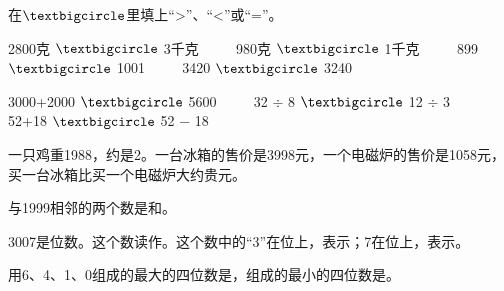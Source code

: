 \documentclass[12pt]{exam-zh}
\begin{document}
\begin{question}
在$\textbigcircle$里填上“>”、“<”或“=”。

2800克 $\textbigcircle$ 3千克 $\quad\quad$ 980克 $\textbigcircle$ 1千克 $\quad\quad$ 899 $\textbigcircle$ 1001 $\quad\quad$ 3420 $\textbigcircle$ 3240

3000+2000 $\textbigcircle$ 5600 $\quad\quad$ 32 $\div$ 8 $\textbigcircle$ 12 $\div$ 3 $\quad\quad$ 52+18 $\textbigcircle$ 52 $-$ 18
\end{question}

\begin{question}
一只鸡重1988\fillin[width=3em][]，约是2\fillin[width=3em][]。一台冰箱的售价是3998元，一个电磁炉的售价是1058元，买一台冰箱比买一个电磁炉大约贵\fillin[width=3em][]元。
\end{question}

\begin{question}
与1999相邻的两个数是\fillin[width=3em][]和\fillin[width=3em][]。
\end{question}

\begin{question}
3007是\fillin[width=3em][]位数。这个数读作\fillin[width=10em][]。这个数中的“3”在\fillin[width=3em][]位上，表示\fillin[width=10em][]；7在\fillin[width=3em][]位上，表示\fillin[width=10em][]。
\end{question}

\begin{question}
用6、4、1、0组成的最大的四位数是\fillin[width=3em][]，组成的最小的四位数是\fillin[width=3em][]。
\end{question}
\end{document}
